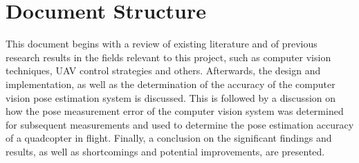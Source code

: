 \section{Document Structure}

This document begins with a review of existing literature and of previous research results in the fields relevant to this project, such as computer vision techniques, UAV control strategies and others. Afterwards, the design and implementation, as well as the determination of the accuracy of the computer vision pose estimation system is discussed. This is followed by a discussion on how the pose measurement error of the computer vision system was determined for subsequent measurements and used to determine the pose estimation accuracy of a quadcopter in flight. Finally, a conclusion on the significant findings and results, as well as shortcomings and potential improvements, are presented. 
